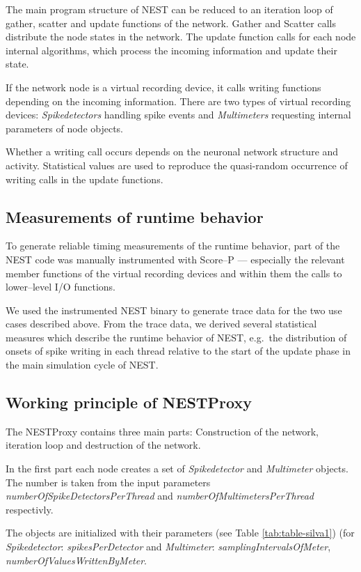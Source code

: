 \documentclass[]{YIC2015}
\begin{document}
The main program structure of NEST can be reduced to an iteration loop
of gather, scatter and update functions of the network. Gather and
Scatter calls distribute the node states in the network. The update
function calls for each node internal algorithms, which process the
incoming information and update their state.

If the network node is a virtual recording device, it calls writing
functions depending on the incoming information. There are two types
of virtual recording devices: \emph{Spikedetectors} handling spike
events and \emph{Multimeters} requesting internal parameters of node
objects.

Whether a writing call occurs depends on the neuronal network
structure and activity. Statistical values are used to reproduce the
quasi-random occurrence of writing calls in the update functions.

\subsection{Measurements of runtime behavior}

To generate reliable timing measurements of the runtime behavior, part
of the NEST code was manually instrumented with Score--P \cite{ScoreP}
--- especially the relevant member functions of the virtual recording
devices and within them the calls to lower--level I/O functions.

We used the instrumented NEST binary to generate trace data for the
two use cases described above. From the trace data, we derived several
statistical measures which describe the runtime behavior of NEST,
e.g.~the distribution of onsets of spike writing in each thread
relative to the start of the update phase in the main simulation cycle
of NEST.

\subsection{Working principle of NESTProxy}

The NESTProxy contains three main parts: Construction of the network,
iteration loop and destruction of the network.

In the first part each node creates a set of \emph{Spikedetector} and
\emph{Multimeter} objects.  The number is taken from the input
parameters \emph{numberOfSpikeDetectorsPerThread} and
\emph{numberOfMultimetersPerThread} respectivly.

The objects are initialized with their parameters (see Table
\ref{tab:table-silva1}) (for \emph{Spikedetector}:
\emph{spikesPerDetector} and \emph{Multimeter}:
\emph{samplingIntervalsOfMeter}, \emph{numberOfValuesWrittenByMeter}.
\end{document}
